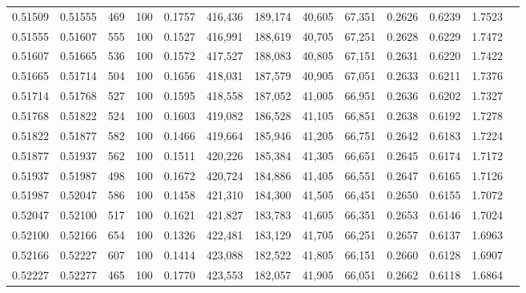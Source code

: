 \begin{tabular}{rrrrrrrrrrrrr}
0.51509 & 0.51555 &   469 & 100 &                                     0.1757 & 416,436 & 189,174 &  40,605 &  67,351 & 0.2626 & 0.6239 & 1.7523 \\
0.51555 & 0.51607 &   555 & 100 &                                     0.1527 & 416,991 & 188,619 &  40,705 &  67,251 & 0.2628 & 0.6229 & 1.7472 \\
0.51607 & 0.51665 &   536 & 100 &                                     0.1572 & 417,527 & 188,083 &  40,805 &  67,151 & 0.2631 & 0.6220 & 1.7422 \\
0.51665 & 0.51714 &   504 & 100 &                                     0.1656 & 418,031 & 187,579 &  40,905 &  67,051 & 0.2633 & 0.6211 & 1.7376 \\
0.51714 & 0.51768 &   527 & 100 &                                     0.1595 & 418,558 & 187,052 &  41,005 &  66,951 & 0.2636 & 0.6202 & 1.7327 \\
0.51768 & 0.51822 &   524 & 100 &                                     0.1603 & 419,082 & 186,528 &  41,105 &  66,851 & 0.2638 & 0.6192 & 1.7278 \\
0.51822 & 0.51877 &   582 & 100 &                                     0.1466 & 419,664 & 185,946 &  41,205 &  66,751 & 0.2642 & 0.6183 & 1.7224 \\
0.51877 & 0.51937 &   562 & 100 &                                     0.1511 & 420,226 & 185,384 &  41,305 &  66,651 & 0.2645 & 0.6174 & 1.7172 \\
0.51937 & 0.51987 &   498 & 100 &                                     0.1672 & 420,724 & 184,886 &  41,405 &  66,551 & 0.2647 & 0.6165 & 1.7126 \\
0.51987 & 0.52047 &   586 & 100 &                                     0.1458 & 421,310 & 184,300 &  41,505 &  66,451 & 0.2650 & 0.6155 & 1.7072 \\
0.52047 & 0.52100 &   517 & 100 &                                     0.1621 & 421,827 & 183,783 &  41,605 &  66,351 & 0.2653 & 0.6146 & 1.7024 \\
0.52100 & 0.52166 &   654 & 100 &                                     0.1326 & 422,481 & 183,129 &  41,705 &  66,251 & 0.2657 & 0.6137 & 1.6963 \\
0.52166 & 0.52227 &   607 & 100 &                                     0.1414 & 423,088 & 182,522 &  41,805 &  66,151 & 0.2660 & 0.6128 & 1.6907 \\
0.52227 & 0.52277 &   465 & 100 &                                     0.1770 & 423,553 & 182,057 &  41,905 &  66,051 & 0.2662 & 0.6118 & 1.6864 \\

\end{tabular}
